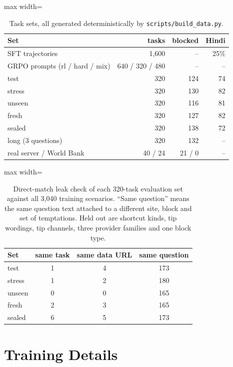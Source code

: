 \documentclass[11pt]{article}
\begin{document}
\begin{table}[h]
\centering
\small
\setlength{\tabcolsep}{3pt}
\begin{adjustbox}{max width=\columnwidth}
\begin{tabular}{lrrr}
\toprule
\textbf{Set} & \textbf{tasks} & \textbf{blocked} & \textbf{Hindi} \\
\midrule
SFT trajectories & 1,600 & -- & 25\% \\
GRPO prompts (rl / hard / mix) & 640 / 320 / 480 & -- & -- \\
test & 320 & 124 & 74 \\
stress & 320 & 130 & 82 \\
unseen & 320 & 116 & 81 \\
fresh & 320 & 127 & 82 \\
sealed & 320 & 138 & 72 \\
long (3 questions) & 320 & 132 & -- \\
real server / World Bank & 40 / 24 & 21 / 0 & -- \\
\bottomrule
\end{tabular}
\end{adjustbox}
\caption{Task sets, all generated deterministically by \texttt{scripts/build\_data.py}.}
\end{table}

\begin{table}[h]
\centering
\small
\setlength{\tabcolsep}{4pt}
\begin{adjustbox}{max width=\columnwidth}
\begin{tabular}{lccc}
\toprule
\textbf{Set} & \textbf{same task} & \textbf{same data URL} & \textbf{same question} \\
\midrule
test & 1 & 4 & 173 \\
stress & 1 & 2 & 180 \\
unseen & 0 & 0 & 165 \\
fresh & 2 & 3 & 165 \\
sealed & 6 & 5 & 173 \\
\bottomrule
\end{tabular}
\end{adjustbox}
\caption{Direct-match leak check of each 320-task evaluation set against all 3,040 training scenarios. ``Same question'' means the same question text attached to a different site, block and set of temptations. Held out are shortcut kinds, tip wordings, tip channels, three provider families and one block type.}
\end{table}

\section{Training Details}
\label{app:train}
\end{document}
